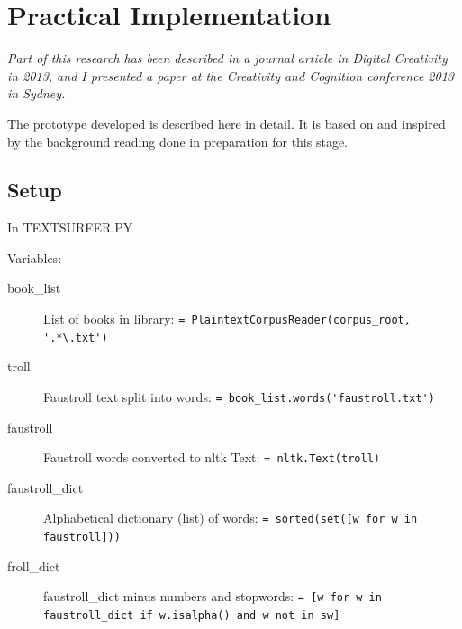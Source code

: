 
\chapter{Practical Implementation}
\label{ch:practical}

\emph{Part of this research has been described in a journal article in Digital Creativity in 2013, and I presented a paper at the Creativity and Cognition conference 2013 in Sydney.}

\grule

The prototype developed is described here in detail. It is based on and inspired by the background reading done in preparation for this stage.



\section{Setup}

In TEXTSURFER.PY

Variables:
\begin{description}
  \item [book\_list] List of books in library: \lstinline$= PlaintextCorpusReader(corpus_root, '.*\.txt')$
  \item [troll] Faustroll text split into words: \lstinline$= book_list.words('faustroll.txt')$
  \item [faustroll] Faustroll words converted to \gls{nltk} Text: \lstinline$= nltk.Text(troll)$
  \item [faustroll\_dict] Alphabetical dictionary (list) of words: \lstinline$= sorted(set([w for w in faustroll]))$
  \item [froll\_dict] faustroll\_dict minus numbers and stopwords: \lstinline$= [w for w in faustroll_dict if w.isalpha() and w not in sw]$
\end{description}

